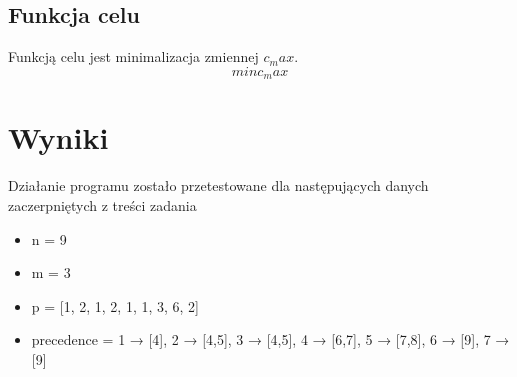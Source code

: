 \documentclass[a4paper,14pt]{report}
\begin{document}
    \subsection{Funkcja celu}
    Funkcją celu jest minimalizacja zmiennej $c_max$.
    \begin{equation}
        min c_max
    \end{equation}
\section{Wyniki}
    Działanie programu zostało przetestowane dla następujących danych zaczerpniętych
    z treści zadania
    \begin{itemize}
        \item n = 9
        \item m = 3
        \item p = [1, 2, 1, 2, 1, 1, 3, 6, 2] 
        \item precedence = 1 → [4], 2 → [4,5], 3 → [4,5], 4 → [6,7], 5 → [7,8], 6 → [9], 7 → [9]
    \end{itemize}
\end{document}
